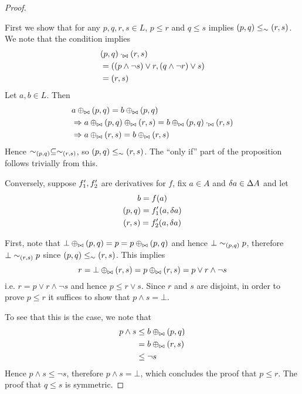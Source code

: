 \booleanAlgebraKernels*
\begin{proof}
  \label{prf:booleanAlgebraKernels}
  
  First we show that for any $p, q, r, s \in L$,
  $p \leq r$ and $q \leq s$ implies $(p, q) \leq_\sim (r, s)$. We
  note that the condition implies
  \begin{align*}
    &(p, q) \cdot_{\bowtie} (r,s)\\
    &= ((p \wedge \neg s) \vee r, (q \wedge \neg r) \vee s)\\
    &= (r,s)
  \end{align*}
  Let $a, b \in L$. Then
  \begin{align*}
    &a \oplus_{\bowtie} (p, q) = b \oplus_{\bowtie} (p, q)\\
    &\Rightarrow a \oplus_{\bowtie} (p, q) \oplus_{\bowtie} (r, s) = b \oplus_{\bowtie} (p, q) \cdot_{\bowtie} (r, s)\\
    &\Rightarrow a \oplus_{\bowtie} (r, s) = b \oplus_{\bowtie} (r, s)
  \end{align*}
  Hence $\sim_{(p,q)} \subseteq \sim_{(r,s)}$, so $(p, q) \leq_\sim (r, s)$. The ``only if''
  part of the proposition follows trivially from this.

  Conversely, suppose $f'_1, f'_2$ are derivatives for $f$, fix
  $a \in A$ and $\delta a \in \Delta A$ and let
  \begin{gather*}
    b = f(a)\\
    (p, q) = f'_1(a, \delta a)\\
    (r, s) = f'_2(a, \delta a)
  \end{gather*}
  
  First, note that $\bot \oplus_{\bowtie} (p, q) = p = p \oplus_{\bowtie} (p, q)$ and hence $\bot \sim_{(p, q)} p$,
  therefore $\bot \sim_{(r, s)} p$ since $(p, q) \leq_\sim (r,s)$. This implies
  \begin{displaymath}
    r = \bot \oplus_{\bowtie} (r, s) =  p \oplus_{\bowtie} (r, s) = p \vee r \wedge \neg s
  \end{displaymath}
  i.e. $r = p \vee r \wedge \neg s$ and hence $p \leq r \vee s$. Since $r$ and $s$ are disjoint,
  in order to prove $p \leq r$ it suffices to show that $p \wedge s = \bot$. 

  To see that this is the case, we note that 
  \begin{align*}
    p \wedge s &\leq b \oplus_{\bowtie} (p, q)\\
               &=b \oplus_{\bowtie} (r, s)\\
               &\leq \neg s
  \end{align*}
  Hence $p \wedge s \leq \neg s$, therefore $p \wedge s = \bot$, which concludes
  the proof that $p \leq r$. The proof that $q \leq s$ is symmetric.
\end{proof}

